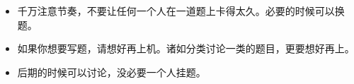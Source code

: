 \begin{itemize}
    \item 千万注意节奏，不要让任何一个人在一道题上卡得太久。必要的时候可以换题。
    \item 如果你想要写题，请想好再上机。诸如分类讨论一类的题目，更要想好再上。
    \item 后期的时候可以讨论，没必要一个人挂题。
\end{itemize}